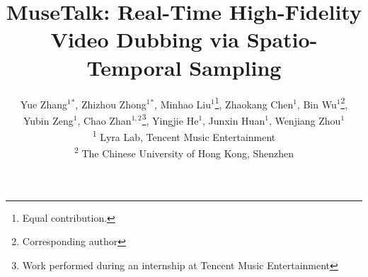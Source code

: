 \documentclass[10pt,twocolumn,letterpaper]{article}
\title{MuseTalk: Real-Time High-Fidelity Video Dubbing via Spatio-Temporal Sampling}
\author{
Yue Zhang$^{1}$$^{*}$, Zhizhou Zhong$^{1}$$^{*}$, Minhao Liu$^{1}$\thanks{Equal contribution.}, Zhaokang Chen$^{1}$, Bin Wu$^{1}$\thanks{Corresponding author}, \\
Yubin Zeng$^{1}$, Chao Zhan$^{1,2}$\thanks{Work performed during an internship at Tencent Music Entertainment}, Yingjie He$^{1}$, Junxin Huan$^{1}$, Wenjiang Zhou$^{1}$ \\
\textsuperscript{1} Lyra Lab, Tencent Music Entertainment \\
\textsuperscript{2} The Chinese University of Hong Kong, Shenzhen
}
\begin{document}
\maketitle
    





{
    \small
    
    
}
%
\end{document}
